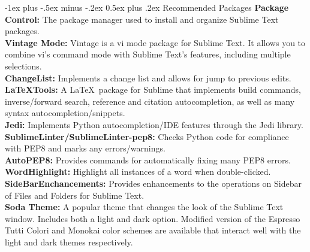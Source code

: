 \documentclass[10pt,landscape]{article}
\makeatletter
\newcommand{\nl}{\\[.3ex]}
\newcommand{\hid}{\hangindent=0.3cm}
\renewcommand{\section}{\@startsection{section}{1}{0mm}%
                                {-1ex plus -.5ex minus -.2ex}%
                                {0.5ex plus .2ex}%
                                {\normalfont\large\bfseries}}
\makeatother
\begin{document}
\begin{multicols*}{3}
\section{Recommended Packages}
\hid
{\bf Package Control:} The package manager used to 
install and organize Sublime Text packages. \nl
\hid
{\bf Vintage Mode:} Vintage is a vi mode package for Sublime Text. It allows 
you to combine vi's command mode with Sublime Text's features, including multiple selections.\nl
\hid
{\bf ChangeList:} Implements a change list and allows for jump to previous edits. \nl
\hid
{\bf LaTeXTools:} A \LaTeX\ package for Sublime that implements build commands, 
inverse/forward search, reference and citation autocompletion, as well as many syntax 
autocompletion/snippets.\nl
\hid
{\bf Jedi:} 
Implements Python autocompletion/IDE features through the Jedi library. 
\nl
\hid
{\bf SublimeLinter/SublimeLinter-pep8:} 
Checks Python code for compliance with PEP8 and marks any errors/warnings. 
\nl
\hid
{\bf AutoPEP8:} 
Provides commands for automatically fixing many PEP8 errors. 
\nl
\hid
{\bf WordHighlight:} 
Highlight all instances of a word when double-clicked. 
\nl
\hid
{\bf SideBarEnchancements:} 
Provides enhancements to the operations on Sidebar of Files and Folders for Sublime Text.
\nl
\hid
{\bf Soda Theme:} 
A popular theme that changes the look of the Sublime Text window. Includes both a light and 
dark option. Modified version of the Espresso Tutti Colori and 
Monokai color schemes are available that interact well with the 
light and dark themes respectively. 
\nl


\end{multicols*}
\end{document}
